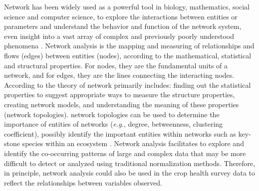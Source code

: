 Network has been widely used as a powerful tool in biology, mathematics, social science and computer science, to explore the interactions between entities or parameters \citep{Kasari_2011_Social, Proulx_2005_Network, Barberan_2012_Network} and understand the behavior and function of the network system, even insight into a vast array of complex and previously poorly understood phenomena \citep{Newman_2003_Structure}. Network analysis is the mapping and measuring of relationships and flows (edges) between entities (nodes), according to the mathematical, statistical and structural properties. For nodes, they are the fundamental units of a network, and for edges, they are the lines connecting the interacting nodes.  According to \citep{Newman_2003_Structure} the theory of network primarily includes: finding out the statistical properties to suggest appropriate ways to measure the structure properties, creating network models, and understanding the meaning of these properties (network topologies). network topologies can be used to determine the importance of entities of networks (\textit{e.g.}, degree, betweenness, clustering coefficient), possibly identify the important entities within networks such as key- stone species within an ecosystem \citep{Lu_2013_Soil, Borthagaray_2014_Inferring}. Network analysis facilitates to explore and identify the co-occurring patterns of large and complex data that may be more difficult to detect or analyzed using traditional normalization methods. Therefore, in principle, network analysis could also be used in the crop health survey data to reflect the relationships between variables observed. 


